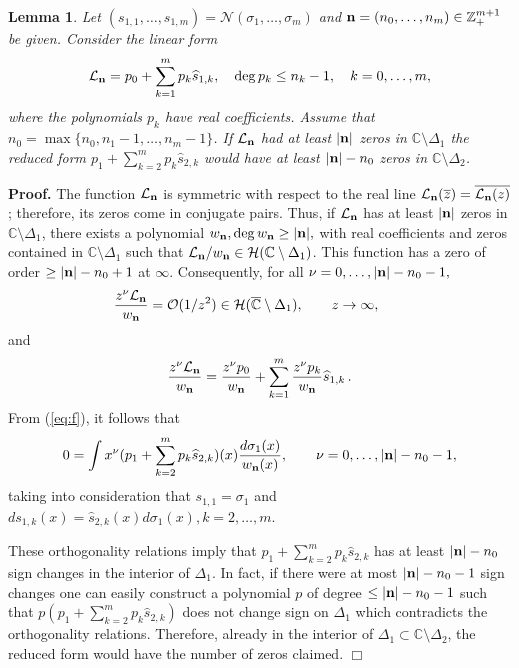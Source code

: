 \documentclass{amsart}
\newtheorem{lemma}{\sc Lemma}[section]
\theoremstyle{definition}
\theoremstyle{remark}
\newcommand{\bl}{\begin{lemma}}
\newcommand{\el}{\end{lemma}}
\begin{document}
\bl
\label{lem:3}
Let $(s_{1,1},\ldots,s_{1,m}) =
{\mathcal{N}}(\sigma_1,\ldots,\sigma_m)$ and ${\bf n} = (n_0,\ldots,n_m) \in
{\mathbb{Z}}_+^{m+1}$ be given. Consider the linear form
\[ {\mathcal{L}}_{\bf n}  = p_0 + \sum_{k=1}^m p_k \widehat{s}_{1,k}, \quad \deg p_k \leq n_k-1, \quad k=0,\ldots,m,
\]
where the polynomials $p_k$ have real coefficients. Assume that $n_0 = \max\{n_0,n_1-1,\ldots,n_m-1\}$. If
${\mathcal{L}}_{\bf n}$ had at least $|{\bf n}|$ zeros in $ {\mathbb{C}} \setminus \Delta_1$ the reduced form
$p_1 + \sum_{k=2}^m p_k \widehat{s}_{2,k}$ would have at least $|{\bf n}| - n_0$ zeros in $ {\mathbb{C}} \setminus \Delta_2$.
\el

{\bf Proof.} The function ${\mathcal{L}}_{\bf n}$ is symmetric with respect to the real line ${\mathcal{L}}_{\bf n}(\overline{z}) = \overline{{\mathcal{L}}_{\bf n}(z)}$; therefore, its zeros come in conjugate pairs. Thus, if ${\mathcal{L}}_{\bf n}$ has at least $|{\bf n}|$ zeros in $ {\mathbb{C}} \setminus \Delta_1$, there exists a polynomial $w_{\bf n}, \deg w_{\bf n}
\geq |{\bf n}|,$  with real coefficients and zeros contained in
${\mathbb{C}}\setminus \Delta_1$ such that ${\mathcal{L}}_{\bf
n}/w_{\bf n} \in {\mathcal{H}}({\mathbb{C}}\setminus \Delta_1)$. This function has a zero of order $ \geq |{\bf n}| - n_0 +1$
at $\infty$. Consequently, for all $ \nu
=0,\ldots,|{\bf n}| - n_0 -1,$
\[ \frac{z^{\nu} {\mathcal{L}}_{\bf n}}{w_{\bf n}} =
{\mathcal{O}}(1/z^2) \in {\mathcal{H}}(\overline{\mathbb{C}} \setminus
\Delta_1), \qquad z \to \infty, \qquad
\]
and
\[ \frac{z^{\nu} {\mathcal{L}}_{\bf n}}{w_{\bf n}} =  \frac{z^{\nu}p_0}{w_{\bf
n}} +  \sum_{k=1}^m \frac{z^{\nu}  p_k }{w_{\bf n}}
\widehat{s}_{1,k}\,.
\]
From (\ref{eq:f}), it follows that
\[ 0 = \int x^{\nu}  ( p_1 + \sum_{k=2}^m p_k
\widehat{s}_{2,k})(x) \frac{d \sigma_1(x)}{w_{\bf n}(x)}, \qquad \nu
=0,\ldots,|{\bf n}| - n_0 -1,
\]
taking into consideration that $s_{1,1} = \sigma_1$ and $ds_{1,k}(x) =
\widehat{s}_{2,k}(x) d\sigma_1(x), k=2,\ldots,m$.

These orthogonality relations imply that $p_1 + \sum_{k=2}^m p_k
\widehat{s}_{2,k}$ has at least $|{\bf n}| - n_0$ sign changes in the interior of $\Delta_1$.  In fact, if there were at most $|{\bf n}| - n_0 -1$ sign changes one can easily construct a polynomial $p$ of degree $\leq |{\bf n}| - n_0 -1$ such that $p(p_1 + \sum_{k=2}^m p_k
\widehat{s}_{2,k})$ does not change sign on $\Delta_1$ which contradicts the orthogonality relations. Therefore, already in the interior of $\Delta_1 \subset {\mathbb{C}} \setminus \Delta_2$, the reduced form would have the number of zeros claimed. \hfill $\Box$ \vspace{0,2cm}
\end{document}
